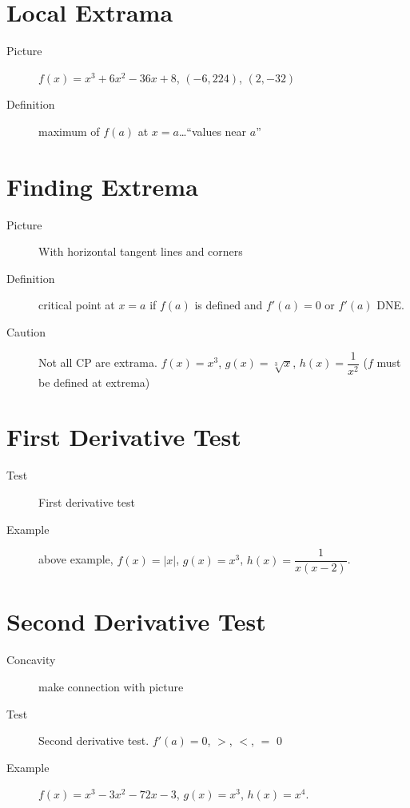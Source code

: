 \documentclass[11pt]{article}
\begin{document}
\drawtitle

\section*{Local Extrama}
\begin{description}
\item[Picture] $f(x)=x^3+6x^2-36x+8$, $(-6,224)$, $(2, -32)$
\item[Definition] maximum of $f(a)$ at $x=a$\dots ``values near $a$'' 

\end{description}

\section*{Finding Extrema}
\begin{description}
\item[Picture] With horizontal tangent lines and corners
\item[Definition] critical point at $x=a$ if $f(a)$ is defined and
  $f'(a)=0$ or $f'(a)$ DNE.
\item[Caution] Not all CP are extrama. $f(x)= x^3$, $g(x)=
  \sqrt[3]{x}$, $h(x)= \dfrac{1}{x^2}$ ($f$ must be defined at extrema)
\end{description}

\section*{First Derivative Test}
\begin{description}
\item[Test] First derivative test
\item[Example] above example, $f(x)=|x|$, $g(x)=x^3$,
  $h(x)=\dfrac{1}{x(x-2)}$.
\end{description}

\section*{Second Derivative Test}

\begin{description}
\item[Concavity] make connection with picture
\item[Test] Second derivative test. $f'(a)=0$, $>$, $<$, $=$ 0
\item[Example] $f(x)=x^3-3x^2-72x-3$, $g(x) = x^3$, $h(x) = x^4$.
\end{description}
\end{document}
